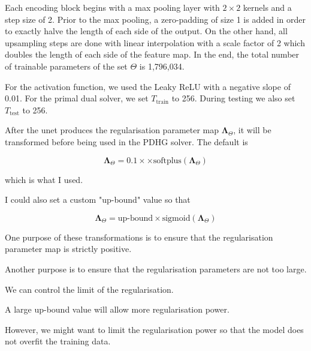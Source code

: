\documentclass[12pt]{article}
\begin{document}
Each encoding block begins with a max pooling layer with $2 \times 2$ kernels and a step size of 2.
Prior to the max pooling, a zero-padding of size 1 is added in order to exactly halve the length of each side of the output.
On the other hand, all upsampling steps are done with linear interpolation with a scale factor of 2 which doubles the length of each side of the feature map.
In the end, the total number of trainable parameters of the set $\Theta$ is 1,796,034.

For the activation function, we used the Leaky ReLU with a negative slope of 0.01.
For the primal dual solver, we set 
$T_{\text{train}}$ to 256.
During testing we also set $T_{\text{test}}$ to 256.



After the unet produces the regularisation parameter map $\mathbf{\Lambda}_{\Theta}$,
it will be transformed before being used in the PDHG solver.
The default is

\begin{equation}
    \mathbf{\Lambda}_{\Theta} = 0.1 \times \times \text{softplus}(\mathbf{\Lambda}_{\Theta})
\end{equation}

which is what I used.

I could also set a custom "up-bound" value so that

\begin{equation}
    \mathbf{\Lambda}_{\Theta} = \text{up-bound} \times \text{sigmoid}(\mathbf{\Lambda}_{\Theta})
\end{equation}

One purpose of these transformations is to ensure that the regularisation parameter map is strictly positive.

Another purpose is to ensure that the regularisation parameters are not too large.

We can control the limit of the regularisation.

A large up-bound value will allow more regularisation power.

However, we might want to limit the regularisation power
so that the model does not overfit the training data.
\end{document}
